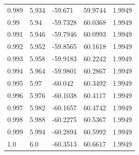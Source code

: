 \begin{tabular}{lllll}
0.989 & 5.934 & -59.671 & 59.9744 & 1.9949 \\
0.99 & 5.94 & -59.7328 & 60.0368 & 1.9949 \\
0.991 & 5.946 & -59.7946 & 60.0993 & 1.9949 \\
0.992 & 5.952 & -59.8565 & 60.1618 & 1.9949 \\
0.993 & 5.958 & -59.9183 & 60.2242 & 1.9949 \\
0.994 & 5.964 & -59.9801 & 60.2867 & 1.9949 \\
0.995 & 5.97 & -60.042 & 60.3492 & 1.9949 \\
0.996 & 5.976 & -60.1038 & 60.4117 & 1.9949 \\
0.997 & 5.982 & -60.1657 & 60.4742 & 1.9949 \\
0.998 & 5.988 & -60.2275 & 60.5367 & 1.9949 \\
0.999 & 5.994 & -60.2894 & 60.5992 & 1.9949 \\
1.0 & 6.0 & -60.3513 & 60.6617 & 1.9949 \\
\bottomrule
\end{tabular}
